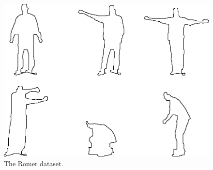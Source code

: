 \begin{figure}
  \centering
\includegraphics[width=120mm]{images/romer.png}
\caption{The Romer dataset.}
\label{fig-romer}
\end{figure}

